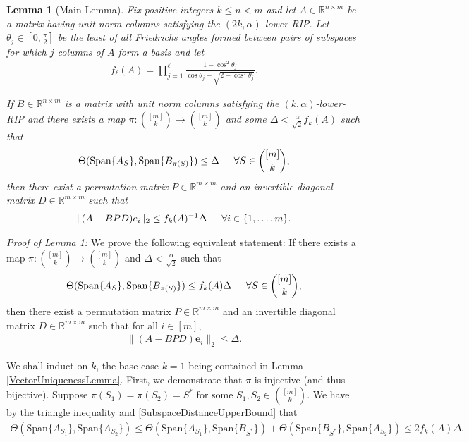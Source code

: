 \documentclass[journal,onecolumn]{IEEEtran}
\newtheorem{lemma}{Lemma}
\begin{document}
\begin{lemma}[Main Lemma]\label{MainLemma}
Fix positive integers $k \leq n < m$ and let $A \in \mathbb{R}^{n \times m}$ be a matrix having unit norm columns satisfying the $(2k,\alpha)$-lower-RIP. Let $\theta_j \in [0, \frac{\pi}{2}]$ be the least of all Friedrichs angles formed between pairs of subspaces for which $j$ columns of $A$ form a basis and let
\begin{align}
f_\ell(A) = \prod_{j=1}^\ell \frac{1 - \cos^2\theta_j} {\cos\theta_j + \sqrt{2 - \cos^2\theta_j}}.
\end{align}

If $B \in \mathbb{R}^{n \times m}$ is a matrix with unit norm columns satisfying the $(k,\alpha)$-lower-RIP and there exists a map $\pi: {[m] \choose k} \to {[m] \choose k}$ and some $\Delta < \frac{\alpha}{\sqrt{2}} f_k(A)$ such that 
\begin{equation}
\Theta(\text{Span}\{A_S\}, \text{Span}\{B_{\pi(S)}\}) \leq \Delta \indent \forall S \in {[m] \choose k},
\end{equation}
%
then there exist a permutation matrix $P \in \mathbb{R}^{m \times m}$ and an invertible diagonal matrix $D \in \mathbb{R}^{m \times m}$ such that
\begin{align}
\|(A - BPD)e_i\|_2 \leq f_k(A)^{-1}\Delta \indent \forall i \in \{1, \ldots, m\}.
\end{align}
\end{lemma}

\emph{Proof of Lemma \ref{MainLemma}:} We prove the following equivalent statement: If there exists a map $\pi: {[m] \choose k} \to {[m] \choose k}$ and $\Delta < \frac{\alpha}{\sqrt{2}}$ such that 
\begin{equation}\label{SubspaceDistanceUpperBound}
\Theta(\text{Span}\{A_S\}, \text{Span}\{B_{\pi(S)}\}) \leq f_k(A) \Delta \indent \forall S \in {[m] \choose k},
\end{equation}
%
then there exist a permutation matrix $P \in \mathbb{R}^{m \times m}$ and an invertible diagonal matrix $D \in \mathbb{R}^{m \times m}$ such that for all $i \in [m]$,
\begin{align}
\|(A - BPD)\mathbf{e}_i\|_2 \leq \Delta .
\end{align}

We shall induct on $k$, the base case $k=1$ being contained in Lemma \ref{VectorUniquenessLemma}. First, we demonstrate that $\pi$ is injective (and thus bijective). Suppose $\pi(S_1) = \pi(S_2) = S^*$ for some $S_1, S_2 \in {[m] \choose k}$. We have by the triangle inequality and \eqref{SubspaceDistanceUpperBound} that
\begin{align}\label{yep}
\Theta(\text{Span}\{A_{S_1}\}, \text{Span}\{A_{S_2}\}) 
\leq \Theta(\text{Span}\{A_{S_1}\}, \text{Span}\{B_{S^*}\}) + \Theta(\text{Span}\{B_{S^*}\}, \text{Span}\{A_{S_2}\}) \leq 2 f_k(A) \Delta.
\end{align}
\end{document}
